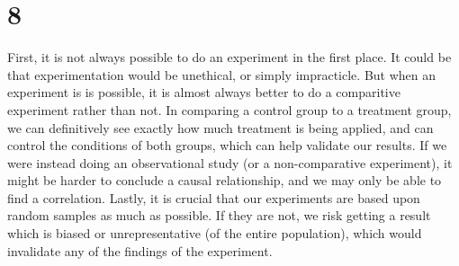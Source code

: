 \documentclass{article}
\theoremstyle{definition}
\newcommand{\?}{\stackrel{?}{=}}
\begin{document}
\section*{8}
First, it is not always possible to do an experiment in the first place. It could be that experimentation would be unethical, or simply impracticle. But when an experiment is 
is possible, it is almost always better to do a comparitive experiment rather than not. In comparing a control group to a treatment group, we can definitively see exactly 
how much treatment is being applied, and can control the conditions of both groups, which can help validate our results. If we were instead doing an observational study 
(or a non-comparative experiment), it 
might be harder to conclude a causal relationship, and we may only be able to find a correlation. Lastly, it is crucial that our experiments are based upon 
random samples as much as possible. If 
they are not, we risk getting a result which is biased or unrepresentative (of the entire population), which would invalidate any of the findings of the experiment. 
\end{document}
